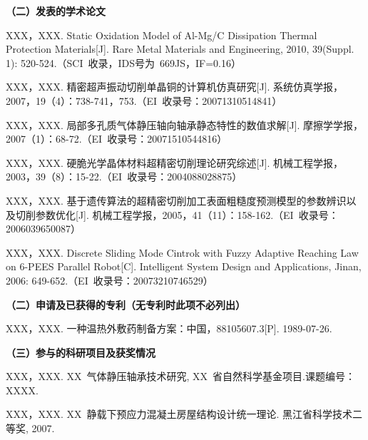 
\begin{publications}{99}
 \noindent\textbf{（二）发表的学术论文}
 \begin{publist}
 \item	XXX，XXX. Static Oxidation Model of Al-Mg/C Dissipation Thermal Protection Materials[J]. Rare Metal Materials and Engineering, 2010, 39(Suppl. 1): 520-524.（SCI~收录，IDS号为~669JS，IF=0.16）
 \item XXX，XXX. 精密超声振动切削单晶铜的计算机仿真研究[J]. 系统仿真学报，2007，19（4）：738-741，753.（EI~收录号：20071310514841）
 \item XXX，XXX. 局部多孔质气体静压轴向轴承静态特性的数值求解[J]. 摩擦学学报，2007（1）：68-72.（EI~收录号：20071510544816）
 \item XXX，XXX. 硬脆光学晶体材料超精密切削理论研究综述[J]. 机械工程学报，2003，39（8）：15-22.（EI~收录号：2004088028875）
 \item XXX，XXX. 基于遗传算法的超精密切削加工表面粗糙度预测模型的参数辨识以及切削参数优化[J]. 机械工程学报，2005，41（11）：158-162.（EI~收录号：2006039650087）
 \item XXX，XXX. Discrete Sliding Mode Cintrok with Fuzzy Adaptive Reaching Law on 6-PEES Parallel Robot[C]. Intelligent System Design and Applications, Jinan, 2006: 649-652.（EI~收录号：20073210746529）
 \end{publist}

 \noindent\textbf{（二）申请及已获得的专利（无专利时此项不必列出）}
 \begin{publist}
 \item XXX，XXX. 一种温热外敷药制备方案：中国，88105607.3[P]. 1989-07-26.
 \end{publist}

 \noindent\textbf{（三）参与的科研项目及获奖情况}
 \begin{publist}
 \item	XXX，XXX. XX~气体静压轴承技术研究, XX~省自然科学基金项目.课题编号：XXXX.
 \item XXX，XXX. XX~静载下预应力混凝土房屋结构设计统一理论. 黑江省科学技术二等奖, 2007.
\end{publist}
    
\end{publications}
